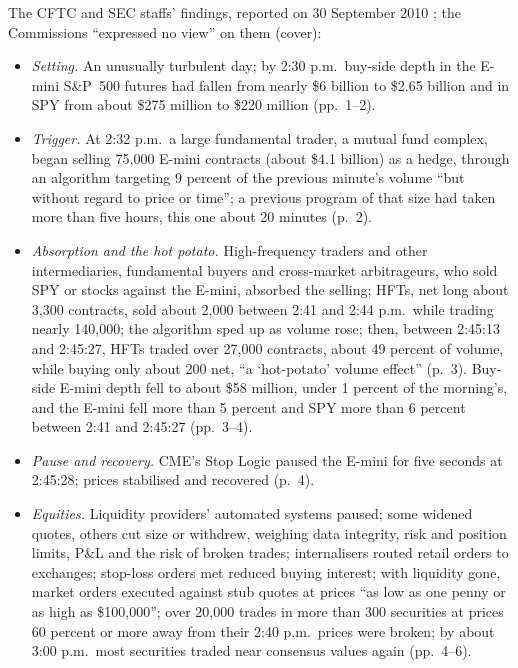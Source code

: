 \begin{qfevidence}\label{ev:may-2010-flash-crash}
 The CFTC and SEC staffs' findings, reported on 30 September 2010 \citep[executive summary, pp.~1--7]{sec-cftc-may6-2010}; the Commissions ``expressed no view'' on them (cover):
\begin{itemize}\setlength{\itemsep}{0pt}
\item \emph{Setting.} An unusually turbulent day; by 2:30 p.m.\ buy-side depth in the E-mini S\&P~500 futures had fallen from nearly \$6 billion to \$2.65 billion and in SPY from about \$275 million to \$220 million (pp.~1--2).
\item \emph{Trigger.} At 2:32 p.m.\ a large fundamental trader, a mutual fund complex, began selling 75{,}000 E-mini contracts (about \$4.1 billion) as a hedge, through an algorithm targeting 9 percent of the previous minute's volume ``but without regard to price or time''; a previous program of that size had taken more than five hours, this one about 20 minutes (p.~2).
\item \emph{Absorption and the hot potato.} High-frequency traders and other intermediaries, fundamental buyers and cross-market arbitrageurs, who sold SPY or stocks against the E-mini, absorbed the selling; HFTs, net long about 3{,}300 contracts, sold about 2{,}000 between 2:41 and 2:44 p.m.\ while trading nearly 140{,}000; the algorithm sped up as volume rose; then, between 2:45:13 and 2:45:27, HFTs traded over 27{,}000 contracts, about 49 percent of volume, while buying only about 200 net, ``a `hot-potato' volume effect'' (p.~3). Buy-side E-mini depth fell to about \$58 million, under 1 percent of the morning's, and the E-mini fell more than 5 percent and SPY more than 6 percent between 2:41 and 2:45:27 (pp.~3--4).
\item \emph{Pause and recovery.} CME's Stop Logic paused the E-mini for five seconds at 2:45:28; prices stabilised and recovered (p.~4).
\item \emph{Equities.} Liquidity providers' automated systems paused; some widened quotes, others cut size or withdrew, weighing data integrity, risk and position limits, P\&L and the risk of broken trades; internalisers routed retail orders to exchanges; stop-loss orders met reduced buying interest; with liquidity gone, market orders executed against stub quotes at prices ``as low as one penny or as high as \$100,000''; over 20{,}000 trades in more than 300 securities at prices 60 percent or more away from their 2:40 p.m.\ prices were broken; by about 3:00 p.m.\ most securities traded near consensus values again (pp.~4--6).
\end{itemize}


\end{qfevidence}
